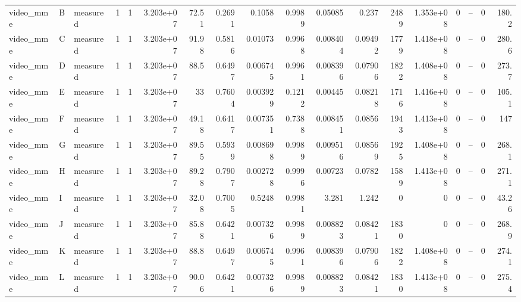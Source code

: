 \begin{longtable}{lllrrrrrrrrrrrrrrr}
video\_mme & B & measured & 1 & 1 & 3.203e+07 & 72.51 & 0.2691 & 0.1058 & 0.9989 & 0.05085 & 0.237 & 2489 & 1.353e+08 & 0 & -- & 0 & 180.2 \\
video\_mme & C & measured & 1 & 1 & 3.203e+07 & 91.98 & 0.5816 & 0.01073 & 0.9968 & 0.008404 & 0.09492 & 1779 & 1.418e+08 & 0 & -- & 0 & 280.6 \\
video\_mme & D & measured & 1 & 1 & 3.203e+07 & 88.5 & 0.6497 & 0.006745 & 0.9961 & 0.008396 & 0.07906 & 1822 & 1.408e+08 & 0 & -- & 0 & 273.7 \\
video\_mme & E & measured & 1 & 1 & 3.203e+07 & 33 & 0.7604 & 0.003929 & 0.1212 & 0.00445 & 0.08218 & 1716 & 1.416e+08 & 0 & -- & 0 & 105.1 \\
video\_mme & F & measured & 1 & 1 & 3.203e+07 & 49.18 & 0.6417 & 0.007351 & 0.7388 & 0.008451 & 0.0856 & 1943 & 1.413e+08 & 0 & -- & 0 & 147 \\
video\_mme & G & measured & 1 & 1 & 3.203e+07 & 89.55 & 0.5939 & 0.008698 & 0.9989 & 0.009516 & 0.08569 & 1925 & 1.408e+08 & 0 & -- & 0 & 268.1 \\
video\_mme & H & measured & 1 & 1 & 3.203e+07 & 89.28 & 0.7907 & 0.002728 & 0.9996 & 0.00723 & 0.0782 & 1589 & 1.413e+08 & 0 & -- & 0 & 271.1 \\
video\_mme & I & measured & 1 & 1 & 3.203e+07 & 32.08 & 0.7005 & 0.5248 & 0.9981 & 3.281 & 1.242 & 0 & 0 & 0 & -- & 0 & 43.26 \\
video\_mme & J & measured & 1 & 1 & 3.203e+07 & 85.88 & 0.6421 & 0.007326 & 0.9989 & 0.008823 & 0.08421 & 1830 & 0 & 0 & -- & 0 & 268.9 \\
video\_mme & K & measured & 1 & 1 & 3.203e+07 & 88.8 & 0.6497 & 0.006745 & 0.9961 & 0.008396 & 0.07906 & 1822 & 1.408e+08 & 0 & -- & 0 & 274.1 \\
video\_mme & L & measured & 1 & 1 & 3.203e+07 & 90.06 & 0.6421 & 0.007326 & 0.9989 & 0.008823 & 0.08421 & 1830 & 1.413e+08 & 0 & -- & 0 & 275.4 \\
\end{longtable}
